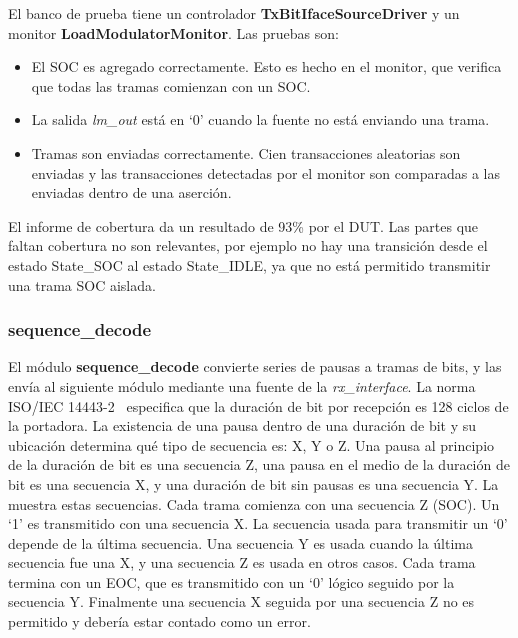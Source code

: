\documentclass[a4paper, twoside, 11pt]{report}
\begin{document}
El banco de prueba tiene un controlador \textbf{TxBitIfaceSourceDriver} y un monitor \textbf{LoadModulatorMonitor}. Las pruebas son:

\begin{itemize}
  \item El SOC es agregado correctamente. Esto es hecho en el monitor, que verifica que todas las tramas comienzan con un SOC.
  \item La salida \textit{lm\_out} está en ‘0’ cuando la fuente no está enviando una trama.
  \item Tramas son enviadas correctamente. Cien transacciones aleatorias son enviadas y las transacciones detectadas por el monitor son comparadas a las enviadas dentro de una aserción.
\end{itemize}

El informe de cobertura da un resultado de 93\% por el DUT. Las partes que faltan cobertura no son relevantes, por ejemplo no hay una transición desde el estado State\_SOC al estado State\_IDLE, ya que no está permitido transmitir una trama SOC aislada.

\FloatBarrier
\subsubsection{sequence\_decode}
\label{sec:sequence_decode}

El módulo \textbf{sequence\_decode} convierte series de pausas a tramas de bits, y las envía al siguiente módulo mediante una fuente de la \textit{rx\_interface}. La norma ISO/IEC 14443-2~\cite{iso14443-2} especifica que la duración de bit por recepción es 128 ciclos de la portadora. La existencia de una pausa dentro de una duración de bit y su ubicación determina qué tipo de secuencia es: X, Y o Z. Una pausa al principio de la duración de bit es una secuencia Z, una pausa en el medio de la duración de bit es una secuencia X, y una duración de bit sin pausas es una secuencia Y.  La  muestra estas secuencias. Cada trama comienza con una secuencia Z (SOC). Un ‘1’ es transmitido con una secuencia X. La secuencia usada para transmitir un ‘0’ depende de la última secuencia. Una secuencia Y es usada cuando la última secuencia fue una X, y una secuencia Z es usada en otros casos. Cada trama termina con un EOC, que es transmitido con un ‘0’ lógico seguido por la secuencia Y. Finalmente una secuencia X seguida por una secuencia Z no es permitido y debería estar contado como un error.
\end{document}
